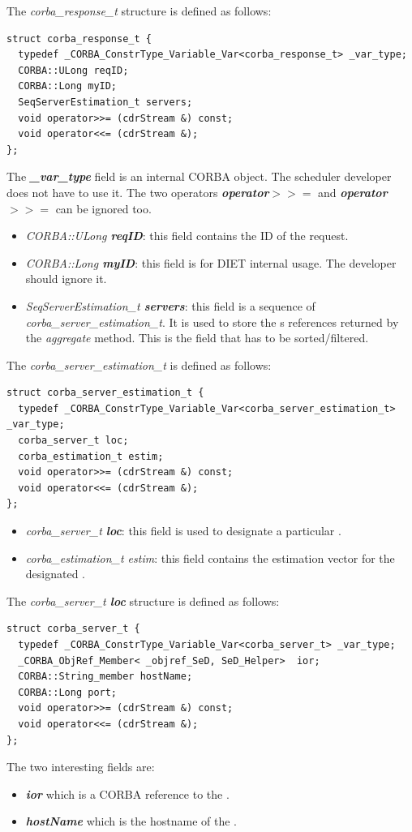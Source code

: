 \noindent The \textit{corba\_response\_t} structure is defined as follows:
\begin{verbatim}
struct corba_response_t {
  typedef _CORBA_ConstrType_Variable_Var<corba_response_t> _var_type;  
  CORBA::ULong reqID;
  CORBA::Long myID;
  SeqServerEstimation_t servers;
  void operator>>= (cdrStream &) const;
  void operator<<= (cdrStream &);
};
\end{verbatim}

\noindent The \textit{\bf \_var\_type} field is an internal CORBA object. The
scheduler developer does not have to use it. The two operators
\textit{\bf operator$>>=$} and \textit{\bf operator$>>=$} can be ignored too.
\begin{itemize}
  \item \textit{CORBA::ULong \bf reqID}: this field contains the ID of the
    request.
  \item \textit{CORBA::Long \bf myID}: this field is for DIET internal usage.
    The developer should ignore it.
  \item \textit{SeqServerEstimation\_t \bf servers}: this field is a sequence
    of \textit{corba\_server\_estimation\_t}. It is used to store the {\sed}s
    references returned by the \textit{aggregate} method. This is the field
    that has to be sorted/filtered.
\end{itemize}

\noindent The \textit{corba\_server\_estimation\_t} is defined as follows:
\begin{verbatim}
struct corba_server_estimation_t {
  typedef _CORBA_ConstrType_Variable_Var<corba_server_estimation_t> _var_type;
  corba_server_t loc;
  corba_estimation_t estim;
  void operator>>= (cdrStream &) const;
  void operator<<= (cdrStream &);
};
\end{verbatim}
\begin{itemize}
  \item \textit{corba\_server\_t \bf loc}: this field is used to designate a
    particular {\sed}.
  \item \textit{corba\_estimation\_t estim}: this field contains the estimation
    vector for the designated {\sed}.
\end{itemize}

\noindent The \textit{corba\_server\_t \bf loc} structure is defined as
follows:
\begin{verbatim}
struct corba_server_t {
  typedef _CORBA_ConstrType_Variable_Var<corba_server_t> _var_type;  
  _CORBA_ObjRef_Member< _objref_SeD, SeD_Helper>  ior;
  CORBA::String_member hostName;
  CORBA::Long port;
  void operator>>= (cdrStream &) const;
  void operator<<= (cdrStream &);
};
\end{verbatim}
The two interesting fields are:
\begin{itemize}
  \item \textit{\bf ior} which is a CORBA reference to the {\sed}.
  \item \textit{\bf hostName} which is the hostname of the {\sed}.
\end{itemize}

